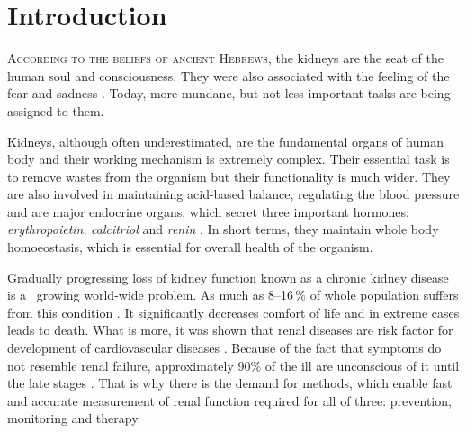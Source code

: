 
	\setcounter{page}{1}
	
	
\chapter{Introduction}



\lettrine[lines=3, slope=1em, findent=-0.8em]{A}{ccording to the beliefs of ancient Hebrews}, the kidneys are the seat of the human soul and consciousness. They were also associated with the feeling of the fear and sadness \cite {maio1999metaphorical}. Today, more mundane, but not less important tasks are being assigned to them. 

Kidneys, although often underestimated, are the fundamental organs of human body and their working mechanism is extremely complex. Their essential task is to remove wastes from the organism but their functionality is much wider. They are also involved in maintaining acid-based balance, regulating the blood pressure and are major endocrine organs, which secret three important hormones: \textit{erythropoietin}, \textit{calcitriol} and \textit{renin} \cite{saladin}. In short terms, they maintain whole body homoeostasis, which is essential for overall health of the organism. 

Gradually progressing loss of kidney function known as a chronic kidney disease is a~ growing world-wide problem. As much as 8--16\,\% of whole population suffers from this condition \cite{statistics}. It significantly decreases comfort of life and in extreme cases leads to death. What is more, it was shown that renal diseases are risk factor for development of cardiovascular diseases \cite{cardiovascular_diseases}.
Because of the fact that symptoms do not resemble renal failure, approximately 90\% of the ill are unconscious of it until the late stages \cite{national_kidney_foundation}. That is why there is the demand for methods, which enable fast and accurate measurement of renal function required for all of three: prevention, monitoring and therapy.

